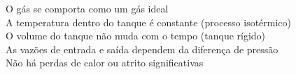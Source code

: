\documentclass[preview]{standalone}
\begin{document}
O gás se comporta como um gás ideal\\A temperatura dentro do tanque é constante (processo isotérmico)\\O volume do tanque não muda com o tempo (tanque rígido)\\As vazões de entrada e saída dependem da diferença de pressão\\Não há perdas de calor ou atrito significativas\\
\end{document}
